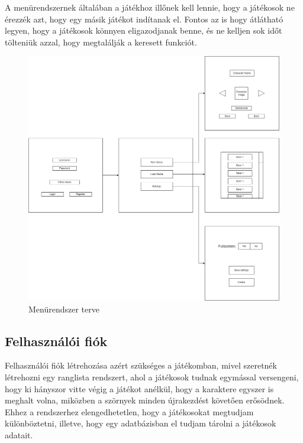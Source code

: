 \indent \indent A menürendszernek általában a játékhoz illőnek kell lennie, hogy a játékosok ne érezzék azt, hogy egy másik játékot indítanak el. Fontos az is hogy átlátható legyen, hogy a játékosok könnyen eligazodjanak benne, és ne kelljen sok időt tölteniük azzal, hogy megtalálják a keresett funkciót.

\begin{figure}[H]
    \centering
    \includegraphics[width=14.0truecm]{images/MS_menu.drawio.png}
    \caption{Menürendszer terve 
    \cite{Menürendszer-terve}}
    \label{fig:Menürendszer terve}
\end{figure}

\subsection{Felhasználói fiók}
\indent \indent Felhasználói fiók létrehozása azért szükséges a játékomban, mivel szeretnék létrehozni egy ranglista rendszert, ahol a játékosok tudnak egymással versengeni, hogy ki hányszor vitte végig a játékot anélkül, hogy a karaktere egyszer is meghalt volna, miközben a szörnyek minden újrakezdést követően erősödnek. Ehhez a rendszerhez elengedhetetlen, hogy a játékosokat megtudjam különböztetni, illetve, hogy egy adatbázisban el tudjam tárolni a játékosok adatait.

